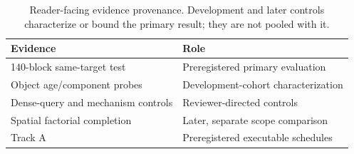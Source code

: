 \begin{table}[t]
\centering
\caption{Reader-facing evidence provenance. Development and later controls
characterize or bound the primary result; they are not pooled with it.}
\label{tab:provenance}
\small
\begin{tabular}{p{}p{}}
\toprule
Evidence & Role \\
\midrule
140-block same-target test & Preregistered primary evaluation \\
Object age/component probes & Development-cohort characterization \\
Dense-query and mechanism controls & Reviewer-directed controls \\
Spatial factorial completion & Later, separate scope comparison \\
Track A & Preregistered executable schedules \\
\bottomrule
\end{tabular}
\end{table}

